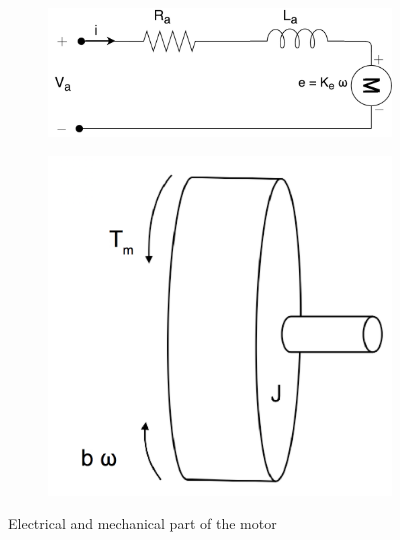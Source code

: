 \begin{figure}[H]
	\begin{minipage}[b]{0.49\linewidth}
		\centering
		\begin{figure}[H]
			\centering
			\includegraphics[width=1\linewidth]{figures/BLDC_el.pdf}
		\end{figure}
	\end{minipage}\hfill
	\begin{minipage}[b]{0.49\linewidth}
		\centering
		\begin{figure}[H]
			\centering
			\includegraphics[width=0.55\linewidth]{figures/flywheel_1}
		\end{figure}
	\end{minipage}
	\caption{ Electrical and mechanical part of the motor }
	\label{fig:electromech}
\end{figure}

